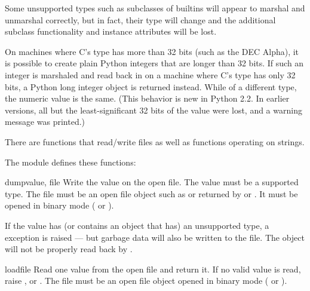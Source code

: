\begin{notice}[warning]
Some unsupported types such as subclasses of builtins will appear to marshal
and unmarshal correctly, but in fact, their type will change and the
additional subclass functionality and instance attributes will be lost.
\end{notice}

 On machines where C's  type has more than
32 bits (such as the DEC Alpha), it is possible to create plain Python
integers that are longer than 32 bits.
If such an integer is marshaled and read back in on a machine where
C's  type has only 32 bits, a Python long integer object
is returned instead.  While of a different type, the numeric value is
the same.  (This behavior is new in Python 2.2.  In earlier versions,
all but the least-significant 32 bits of the value were lost, and a
warning message was printed.)

There are functions that read/write files as well as functions
operating on strings.

The module defines these functions:

\begin{funcdesc}{dump}{value, file}
  Write the value on the open file.  The value must be a supported
  type.  The file must be an open file object such as
   or returned by  or
  .  It must be opened in binary mode
  ( or ).

  If the value has (or contains an object that has) an unsupported type,
  a  exception is raised --- but garbage data
  will also be written to the file.  The object will not be properly
  read back by .

\end{funcdesc}

\begin{funcdesc}{load}{file}
  Read one value from the open file and return it.  If no valid value
  is read, raise ,  or
  .  The file must be an open file object opened
  in binary mode ( or ).

\end{funcdesc}

